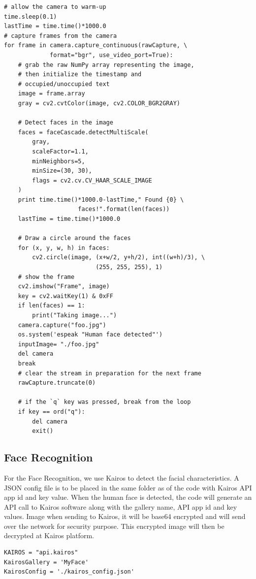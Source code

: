 \documentclass[sigconf]{acmart}
\begin{document}
\begin{verbatim}
# allow the camera to warm-up
time.sleep(0.1)
lastTime = time.time()*1000.0
# capture frames from the camera
for frame in camera.capture_continuous(rawCapture, \ 
             format="bgr", use_video_port=True):
	# grab the raw NumPy array representing the image, 
	# then initialize the timestamp and 
	# occupied/unoccupied text
    image = frame.array
    gray = cv2.cvtColor(image, cv2.COLOR_BGR2GRAY)
    
    # Detect faces in the image
    faces = faceCascade.detectMultiScale(
    	gray,
    	scaleFactor=1.1,
    	minNeighbors=5,
    	minSize=(30, 30),
    	flags = cv2.cv.CV_HAAR_SCALE_IMAGE
    )
    print time.time()*1000.0-lastTime," Found {0} \ 
                     faces!".format(len(faces))
    lastTime = time.time()*1000.0

    # Draw a circle around the faces
    for (x, y, w, h) in faces:
        cv2.circle(image, (x+w/2, y+h/2), int((w+h)/3), \ 
                          (255, 255, 255), 1)
    # show the frame
    cv2.imshow("Frame", image)
    key = cv2.waitKey(1) & 0xFF
    if len(faces) == 1:
        print("Taking image...")
	camera.capture("foo.jpg")
	os.system('espeak "Human face detected"')
	inputImage= "./foo.jpg"
	del camera
	break 
	# clear the stream in preparation for the next frame
    rawCapture.truncate(0)
    
	# if the `q` key was pressed, break from the loop
    if key == ord("q"):
        del camera
        exit()
\end{verbatim}


\subsection{Face Recognition}
For the Face Recognition, we use Kairos to detect the facial characteristics. A JSON config file 
is to be placed in the same folder as of the code with Kairos API app id and key value. When the 
human face is detected, the code will generate an API call to Kairos software along with the 
gallery name, API app id and key values. Image when sending to Kairos, it will be base64 
encrypted and will send over the network for security purpose. This encrypted image will 
then be decrypted at Kairos platform.


\begin{verbatim}
KAIROS = "api.kairos"
KairosGallery = 'MyFace'
KairosConfig = './kairos_config.json'
\end{verbatim}
\end{document}
